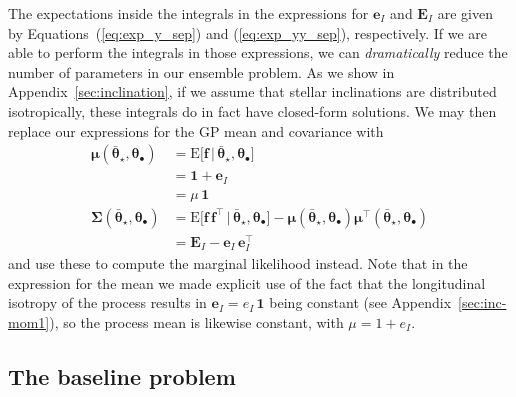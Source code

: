 \documentclass[modern]{aastex62}
\begin{document}
%
The expectations inside the integrals in the expressions for
$\mathbf{e}_I$ and $\mathbf{E}_I$
are given by
Equations~(\ref{eq:exp_y_sep}) and (\ref{eq:exp_yy_sep}), respectively.
%
If we are able to perform the integrals in those expressions,
we can \emph{dramatically} reduce the number of
parameters in our ensemble problem.
%
As we show in Appendix~\ref{sec:inclination}, if we assume that stellar
inclinations are distributed isotropically, these integrals
do in fact have closed-form solutions.
%
We may then replace our expressions for the GP mean and covariance with
%
\begin{align}
    \label{eq:mu_marg}
    \pmb{\mu}(\bar{\pmb{\theta}}_\star, \pmb{\theta}_\bullet)
     & = \mathrm{E} \Big[ \mathbf{f} \, \Big| \, \bar{\pmb{\theta}}_\star, \pmb{\theta}_\bullet \Big]
    \nonumber                                                                                                                                                                                                                                       \\
     & = \mathbf{1} + \mathbf{e}_I
    \nonumber                                                                                                                                                                                                                                       \\
     & = \mu \, \mathbf{1}
    \\[0.5em]
    \label{eq:cov_marg}
    \pmb{\Sigma}(\bar{\pmb{\theta}}_\star, \pmb{\theta}_\bullet)
     & = \mathrm{E} \Big[ \mathbf{f} \, \mathbf{f}^\top \, \Big| \, \bar{\pmb{\theta}}_\star, \pmb{\theta}_\bullet \Big] - \pmb{\mu}(\bar{\pmb{\theta}}_\star, \pmb{\theta}_\bullet) \pmb{\mu}^\top(\bar{\pmb{\theta}}_\star, \pmb{\theta}_\bullet)
    \nonumber
    \\
     & =
    \mathbf{E}_I
    -
    \mathbf{e}_I \,
    \mathbf{e}_I^\top
\end{align}
%
and use these to compute the marginal likelihood instead. Note that in the
expression for the mean we made explicit use of the fact that the longitudinal
isotropy of the process results in $\mathbf{e}_I = e_I \, \mathbf{1}$ being
constant (see Appendix~\ref{sec:inc-mom1}), so the process mean is likewise
constant, with $\mu = 1 + e_I$.

\subsection{The baseline problem}
\label{sec:baseline}
\end{document}
